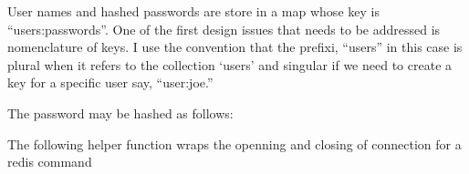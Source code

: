 User names and hashed passwords are store in a map whose key is
``users:passwords''. One of the first design issues that needs to be
addressed is nomenclature of keys. I use the convention that the
prefixi, ``users'' in this case is plural when it refers to the
collection `users' and singular if we need to create a key for a
specific user say, ``user:joe.''

The password may be hashed as follows:

\begin{Shaded}
\begin{Highlighting}[]
 \OperatorTok{(}\OperatorTok{,}\OperatorTok{)}  
\OperatorTok{=} 
  \OperatorTok{=}\OperatorTok{:}\OperatorTok{()} 
  \OperatorTok{=} 
\OperatorTok{:}\OperatorTok{(}\OperatorTok{)}
\OperatorTok{:}\OperatorTok{(}\OperatorTok{)} 
\OperatorTok{:}\OperatorTok{(}\OperatorTok{)}               
  \OperatorTok{(}\OperatorTok{:}\OperatorTok{())}
\end{Highlighting}
\end{Shaded}

The following helper function wraps the openning and closing of
connection for a redis command

\begin{Shaded}
\begin{Highlighting}[]
 \OperatorTok{(}\OperatorTok{)}
  \OperatorTok{=}\OperatorTok{:}\OperatorTok{()}

\OperatorTok{:}\OperatorTok{(}\OperatorTok{,} \OperatorTok{,} \OperatorTok{)} 
  \OperatorTok{(}\OperatorTok{:}\OperatorTok{(}\OperatorTok{,} \OperatorTok{))}
  \OperatorTok{,}\OperatorTok{=}\OperatorTok{(}\OperatorTok{)}
\OperatorTok{:}\OperatorTok{(}\OperatorTok{,}\OperatorTok{)}
    \OperatorTok{,}
\end{Highlighting}
\end{Shaded}

